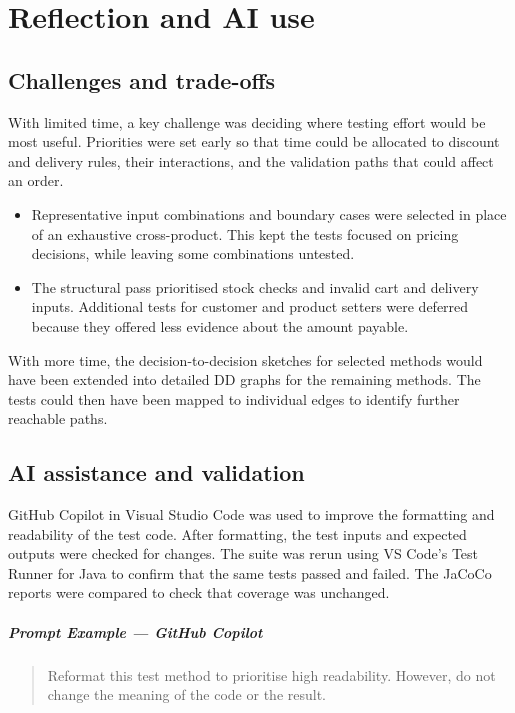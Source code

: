 \chapter{Reflection and AI use}
\label{chap:project-management}

\section{Challenges and trade-offs}
With limited time, a key challenge was deciding where testing effort
would be most useful. Priorities were set early so that time could be
allocated to discount and delivery rules, their interactions, and the
validation paths that could affect an order.

\begin{itemize}
    \item Representative input combinations and boundary cases were
    selected in place of an exhaustive cross-product. This kept the
    tests focused on pricing decisions, while leaving some combinations
    untested.
    \item The structural pass prioritised stock checks and invalid
    cart and delivery inputs. Additional tests for customer and product
    setters were deferred because they offered less evidence about
    the amount payable.
\end{itemize}

With more time, the decision-to-decision sketches for selected methods
would have been extended into detailed DD graphs for the remaining
methods. The tests could then have been mapped to individual edges to
identify further reachable paths.

\section{AI assistance and validation}
GitHub Copilot in Visual Studio Code was used to improve the formatting
and readability of the test code. After formatting, the test inputs and
expected outputs were checked for changes. The suite was rerun using
VS Code's Test Runner for Java to confirm that the same tests passed
and failed. The JaCoCo reports were compared to check that coverage
was unchanged.

\paragraph{Prompt Example --- GitHub Copilot}
\begin{quote}
Reformat this test method to prioritise high readability. However, do not change the meaning of the code or the result.
\end{quote}